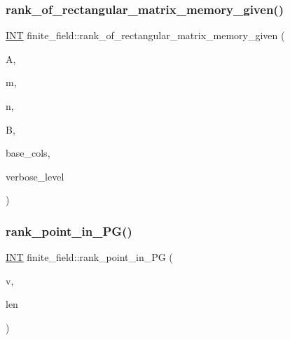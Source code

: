 \subsubsection{\texorpdfstring{rank\+\_\+of\+\_\+rectangular\+\_\+matrix\+\_\+memory\+\_\+given()}{rank\_of\_rectangular\_matrix\_memory\_given()}}
{\footnotesize\ttfamily \mbox{\hyperlink{galois_8h_a09fddde158a3a20bd2dcadb609de11dc}{I\+NT}} finite\+\_\+field\+::rank\+\_\+of\+\_\+rectangular\+\_\+matrix\+\_\+memory\+\_\+given (\begin{DoxyParamCaption}\item[{\mbox{\hyperlink{galois_8h_a09fddde158a3a20bd2dcadb609de11dc}{I\+NT}} $\ast$}]{A,  }\item[{\mbox{\hyperlink{galois_8h_a09fddde158a3a20bd2dcadb609de11dc}{I\+NT}}}]{m,  }\item[{\mbox{\hyperlink{galois_8h_a09fddde158a3a20bd2dcadb609de11dc}{I\+NT}}}]{n,  }\item[{\mbox{\hyperlink{galois_8h_a09fddde158a3a20bd2dcadb609de11dc}{I\+NT}} $\ast$}]{B,  }\item[{\mbox{\hyperlink{galois_8h_a09fddde158a3a20bd2dcadb609de11dc}{I\+NT}} $\ast$}]{base\+\_\+cols,  }\item[{\mbox{\hyperlink{galois_8h_a09fddde158a3a20bd2dcadb609de11dc}{I\+NT}}}]{verbose\+\_\+level }\end{DoxyParamCaption})}

\mbox{\label{classfinite__field_a6736b77d943ec49ca1c882e0fd698790}} 
\subsubsection{\texorpdfstring{rank\+\_\+point\+\_\+in\+\_\+\+P\+G()}{rank\_point\_in\_PG()}}
{\footnotesize\ttfamily \mbox{\hyperlink{galois_8h_a09fddde158a3a20bd2dcadb609de11dc}{I\+NT}} finite\+\_\+field\+::rank\+\_\+point\+\_\+in\+\_\+\+PG (\begin{DoxyParamCaption}\item[{\mbox{\hyperlink{galois_8h_a09fddde158a3a20bd2dcadb609de11dc}{I\+NT}} $\ast$}]{v,  }\item[{\mbox{\hyperlink{galois_8h_a09fddde158a3a20bd2dcadb609de11dc}{I\+NT}}}]{len }\end{DoxyParamCaption})}

